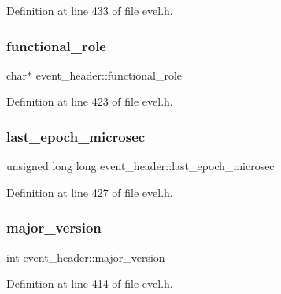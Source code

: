 Definition at line 433 of file evel.\+h.

\hypertarget{structevent__header_a12896af9697cc5e5b678123a381c5086}{}\label{structevent__header_a12896af9697cc5e5b678123a381c5086} 
\subsubsection{\texorpdfstring{functional\+\_\+role}{functional\_role}}
{\footnotesize\ttfamily char$\ast$ event\+\_\+header\+::functional\+\_\+role}



Definition at line 423 of file evel.\+h.

\hypertarget{structevent__header_a5b7f178cb9755cc1f2b635e6c615133c}{}\label{structevent__header_a5b7f178cb9755cc1f2b635e6c615133c} 
\subsubsection{\texorpdfstring{last\+\_\+epoch\+\_\+microsec}{last\_epoch\_microsec}}
{\footnotesize\ttfamily unsigned long long event\+\_\+header\+::last\+\_\+epoch\+\_\+microsec}



Definition at line 427 of file evel.\+h.

\hypertarget{structevent__header_ae350e9b0c027ad985d6513ee01264bc4}{}\label{structevent__header_ae350e9b0c027ad985d6513ee01264bc4} 
\subsubsection{\texorpdfstring{major\+\_\+version}{major\_version}}
{\footnotesize\ttfamily int event\+\_\+header\+::major\+\_\+version}



Definition at line 414 of file evel.\+h.

\hypertarget{structevent__header_a390f32dd59f12830f4b88b967a8aee3d}{}\label{structevent__header_a390f32dd59f12830f4b88b967a8aee3d} 

